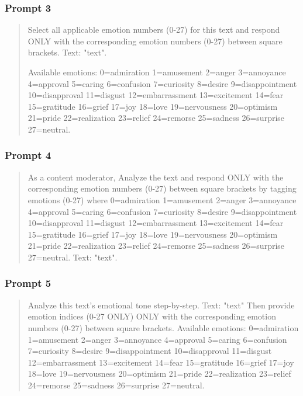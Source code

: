 \documentclass[titlepage]{article}
\begin{document}
\subsubsection{Prompt 3}
\begin{quote}
    Select all applicable emotion numbers (0-27) for this text and respond ONLY with the corresponding emotion numbers (0-27) between 
    square brackets. Text: "{text}". 

    Available emotions:
    0=admiration 1=amusement 2=anger 3=annoyance 4=approval 5=caring 6=confusion 7=curiosity 8=desire 9=disappointment 
    10=disapproval 11=disgust 12=embarrassment 13=excitement 14=fear 15=gratitude 16=grief 17=joy 18=love 
    19=nervousness 20=optimism 21=pride 22=realization 23=relief 24=remorse 25=sadness 26=surprise 27=neutral.
\end{quote}

\subsubsection{Prompt 4}
\begin{quote}
    As a content moderator, Analyze the text and respond ONLY with the corresponding emotion numbers (0-27) between square 
    brackets by tagging emotions (0-27) where 0=admiration 1=amusement 2=anger 
    3=annoyance 4=approval 5=caring 6=confusion 7=curiosity 8=desire 9=disappointment 10=disapproval 11=disgust 
    12=embarrassment 13=excitement 14=fear 15=gratitude 16=grief 17=joy 18=love 19=nervousness 20=optimism 21=pride 
    22=realization 23=relief 24=remorse 25=sadness 26=surprise 27=neutral.
    Text: "{text}". 
\end{quote}

\subsubsection{Prompt 5}
\begin{quote}
    Analyze this text's emotional tone step-by-step.
    Text: "{text}" Then provide emotion indices (0-27 ONLY) ONLY with the corresponding emotion numbers (0-27) between square 
    brackets.
    Available emotions:
    0=admiration 1=amusement 2=anger 3=annoyance 4=approval 
    5=caring 6=confusion 7=curiosity 8=desire 9=disappointment 10=disapproval 11=disgust 12=embarrassment 13=excitement 
    14=fear 15=gratitude 16=grief 17=joy 18=love 19=nervousness 20=optimism 21=pride 22=realization 
    23=relief 24=remorse 25=sadness 26=surprise 27=neutral.
\end{quote}
\end{document}
